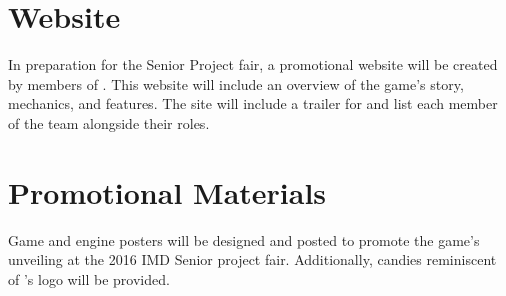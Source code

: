 \section{Website}
In preparation for the Senior Project fair, a promotional website will be created by members of \ourteam{}. This website will include an overview of the game's story, mechanics, and features. The site will include a trailer for \ourgame{} and list each member of the team alongside their roles.

\section{Promotional Materials}
Game and engine posters will be designed and posted to promote the game's unveiling at the 2016 IMD Senior project fair. Additionally, candies reminiscent of \ourteam{}'s logo will be provided.